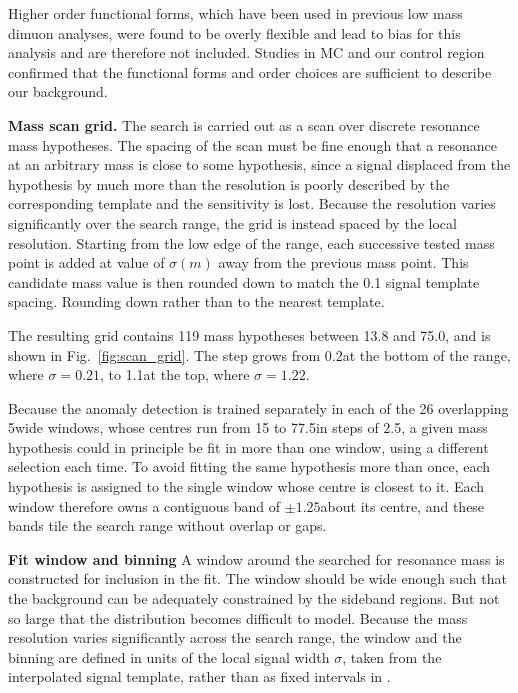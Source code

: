 Higher order functional forms, which have been used in previous low mass dimuon analyses, were found to be overly flexible and lead to bias for this analysis and are therefore not included.
Studies in MC and our control region confirmed that the functional forms and order choices are sufficient to describe our background. 


\textbf{Mass scan grid.}
The search is carried out as a scan over discrete resonance mass hypotheses.
The spacing of the scan must be fine enough that a resonance at an arbitrary mass is
close to some hypothesis, since a signal displaced from the hypothesis by much more than the resolution is
poorly described by the corresponding template and the sensitivity is lost.
Because the resolution varies significantly over the search range, the grid is instead spaced by the local
resolution.
Starting from the low edge of the range, each successive tested mass point is added at value of $\sigma(m)$ away from 
the previous mass point. This candidate mass value is then rounded down to match the 0.1 \GeV signal template spacing.
Rounding down rather than to the nearest template.

The resulting grid contains 119 mass hypotheses between 13.8 and 75.0\GeV, and is shown in
Fig.~\ref{fig:scan_grid}.
The step grows from 0.2\GeV at the bottom of the range, where $\sigma = 0.21$\GeV, to 1.1\GeV at the top,
where $\sigma = 1.22$\GeV.

Because the anomaly detection is trained separately in each of the 26 overlapping 5\GeV wide windows, whose
centres run from 15 to 77.5\GeV in steps of 2.5\GeV, a given mass hypothesis could in principle be fit in
more than one window, using a different selection each time.
To avoid fitting the same hypothesis more than once, each hypothesis is assigned to the single window whose
centre is closest to it.
Each window therefore owns a contiguous band of $\pm 1.25$\GeV about its centre, and these bands tile the
search range without overlap or gaps.


\textbf{Fit window and binning}
A window around the searched for resonance mass is constructed for inclusion in the fit.
The window should be wide enough such that the background can be adequately constrained by the sideband regions.
But not so large that the distribution becomes difficult to model.
Because the mass resolution varies significantly across the search range, the window and the
binning are defined in units of the local signal width $\sigma$, taken from the interpolated signal
template, rather than as fixed intervals in \GeVns.

